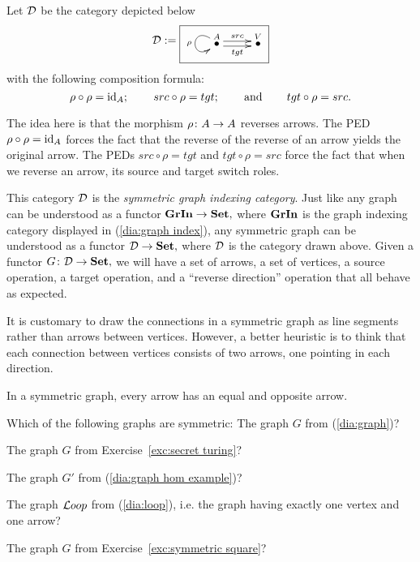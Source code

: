 \documentclass[../main/CT4S-EN-RU]{subfiles}
\begin{document}
\begin{blockRUS}
\end{blockRUS}

\begin{exampleENG}
Let $\mathcal{D}$ be the category depicted below
\begin{align}\label{dia:symmetric graph index}
\mcD:=\fbox{\xymatrix{\LMO{A}\ar@(lu,ld)[]_\rho\ar@<.5ex>[r]^{src}\ar@<-.5ex>[r]_{tgt}&\LMO{V}}}
\end{align}
with the following composition formula: 
$$\rho\circ\rho=\operatorname{id}_A;\hspace{.3in} src\circ\rho=tgt;\hspace{.3in}\textnormal{and}\hspace{.3in} tgt\circ\rho=src.$$

The idea here is that the morphism $\rho\colon A\rightarrow A$ reverses arrows. The PED $\rho\circ\rho=\operatorname{id}_A$ forces the fact that the reverse of the reverse of an arrow yields the original arrow. The PEDs $src\circ\rho=tgt$ and $tgt\circ\rho=src$ force the fact that when we reverse an arrow, its source and target switch roles. 

This category $\mathcal{D}$ is the {\em symmetric graph indexing category}. Just like any graph can be understood as a functor ${\mathbf{GrIn}}\rightarrow{\mathbf{Set}},$ where ${\mathbf{GrIn}}$ is the graph indexing category displayed in (\ref{dia:graph index}), any symmetric graph can be understood as a functor $\mathcal{D}\rightarrow{\mathbf{Set}},$ where $\mathcal{D}$ is the category drawn above. Given a functor $G\colon\mathcal{D}\rightarrow{\mathbf{Set}},$ we will have a set of arrows, a set of vertices, a source operation, a target operation, and a “reverse direction” operation that all behave as expected.

It is customary to draw the connections in a symmetric graph as line segments rather than arrows between vertices. However, a better heuristic is to think that each connection between vertices consists of two arrows, one pointing in each direction. 
\end{exampleENG}

\begin{exampleRUS}
\end{exampleRUS}

\begin{sloganENG}
In a symmetric graph, every arrow has an equal and opposite arrow.
\end{sloganENG}

\begin{sloganRUS}
\end{sloganRUS}

\begin{exerciseENG}
Which of the following graphs are symmetric:
\sexc The graph $G$ from (\ref{dia:graph})?
\item The graph $G$ from Exercise~\ref{exc:secret turing}?
\item The graph $G'$ from (\ref{dia:graph hom example})?
\item The graph ${\mathcal{L} oop}$ from (\ref{dia:loop}), i.e. the graph having exactly one vertex and one arrow?
\item The graph $G$ from Exercise~\ref{exc:symmetric square}?
\endsexc
\end{exerciseENG}
\end{document}
